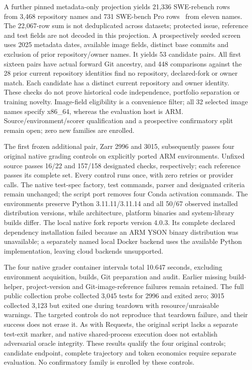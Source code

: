 A further pinned metadata-only projection yields 21,336 SWE-rebench
rows~\citep{swerebenchmetadata2026} from 3,468 repository names and 731
SWE-bench Pro rows~\citep{swebenchprometadata2026} from eleven names.
The 22,067-row sum is not deduplicated across datasets; protected issue,
reference and test fields are not decoded in this projection. A prospectively
seeded screen uses 2025 metadata dates, available image fields, distinct base
commits and exclusion of prior repository/owner names. It yields 53 candidate
pairs. All first sixteen pairs have actual forward Git ancestry, and 448
comparisons against the 28 prior current repository identities find no
repository, declared-fork or owner match. Each candidate has a distinct current
repository and owner identity. These checks do not prove historical code
independence, portfolio separation or training novelty. Image-field eligibility
is a convenience filter; all 32 selected image names specify x86\_64, whereas
the evaluation host is ARM. Source/environment/scorer qualification and a
prospective confirmatory split remain open; zero new families are enrolled.

The first frozen additional pair, Zarr 2996 and 3015, subsequently passes four
original native grading controls on explicitly ported ARM environments. Unfixed
source passes 16/22 and 157/158 designated checks, respectively; each reference
passes its complete set. Every control runs once, with zero retries or provider
calls. The native test-spec factory, test commands, parser and designated
criteria remain unchanged; the script port removes four Conda activation
commands. The environments preserve Python 3.11.11/3.11.14 and all 50/67
observed installed distribution versions, while architecture, platform binaries
and system-library builds differ. The local native fork reports version 4.0.3.
Its complete declared dependency installation failed because an ARM YSON
binary distribution was unavailable; a separately named local Docker backend
uses the available Python implementation, leaving cloud backends unsupported.

The four native grader container intervals total 10.647 seconds, excluding
environment acquisition, builds, Git preparation and audit. Earlier missing
build-helper, project-version and Git-image-reference failures remain retained.
The full public collection probe collected 3,045 tests for 2996 and exited zero;
3015 collected 3,123 but exited one during teardown with resource/unraisable
warnings. The targeted controls do not reproduce that teardown failure, and
their success does not erase it. As with Requests, the original script lacks
a separate test-exit marker, and native shared-process execution does not
establish adversarial oracle integrity. These results qualify the four original
controls; candidate endpoint, complete trajectory and token economics require
separate evaluation. No confirmatory family is enrolled by these controls.

